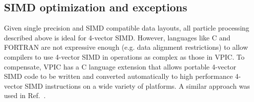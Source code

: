 \documentclass[journal,twoside]{IEEEtran}
\begin{document}

\subsection{SIMD optimization and exceptions}

Given single precision and SIMD compatible data layouts, all particle
processing described above is ideal for 4-vector SIMD.  However,
languages like C and FORTRAN are not expressive enough (e.g. data
alignment restrictions) to allow compilers to use 4-vector SIMD in
operations as complex as those in VPIC.  To compensate, VPIC has a C
language extension that allows portable 4-vector SIMD code to be
written and converted automatically to high performance 4-vector SIMD
instructions on a wide variety of platforms.  A similar approach was
used in Ref.~\cite{Bowers_et_al_2006}.

\end{document}
